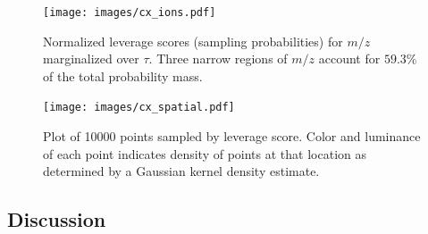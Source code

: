     \begin{figure} [h!btp]
    \begin{centering}
    \texttt{[image: images/cx\_ions.pdf]}
    \end{centering}
    \caption{Normalized leverage scores (sampling probabilities) for $m/z$ marginalized over $\tau$.
      Three narrow regions of $m/z$ account for $59.3\%$ of the total probability mass.}
    \label{fig:cx_ions}
    \end{figure} 
    
    \begin{figure} [h!btp]
    \begin{centering}
    \texttt{[image: images/cx\_spatial.pdf]}
    \end{centering}
    \caption{Plot of 10000 points sampled by leverage score. Color and
      luminance of each point indicates density of points at that location as
      determined by a Gaussian kernel density estimate.}
    \label{fig:cx_spatial}
    \end{figure} 


  \subsection{Discussion}
  \label{sect:lessons}
  
  

